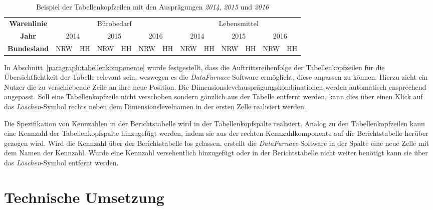 \documentclass[
  language=german, %
  type=bachelor%
]{isthesis}
\begin{document}
\begin{content}
    \begin{table}
      \footnotesize
      \begin{tabular}{c c c c c c c c c c c c c}
        \textbf{Warenlinie} & \multicolumn{6}{c}{Bürobedarf} & \multicolumn{6}{c}{Lebensmittel} \\
        \textbf{Jahr} & \multicolumn{2}{c}{2014} & \multicolumn{2}{c}{2015} & \multicolumn{2}{c}{2016} & \multicolumn{2}{c}{2014} & \multicolumn{2}{c}{2015} & \multicolumn{2}{c}{2016}\\
        \textbf{Bundesland} & NRW & HH & NRW & HH & NRW & HH & NRW & HH & NRW & HH & NRW & HH \\
      \end{tabular}
      \caption{Beispiel der Tabellenkopfzeilen mit den Ausprägungen \textit{2014}, \textit{2015} und \textit{2016}}\label{table:berichtstabellenkopf201420152016}
    \end{table}

  In Abschnitt~\ref{paragraph:tabellenkomponente} wurde festgestellt, dass die
  Auftrittsreihenfolge der Tabellenkopfzeilen für die Übersichtlichtkeit der
  Tabelle relevant sein, weswegen es die \textit{DataFurnace}-Software
  ermöglicht, diese anpassen zu können. Hierzu zieht ein Nutzer die zu
  verschiebende Zeile an ihre neue Position. Die
  Dimensionslevelausprägungskombinationen werden automatisch ensprechend
  angepasst. Soll eine Tabellenkopfzeile nicht verschoben sondern gänzlich aus
  der Tabelle entfernt werden, kann dies über einen Klick auf das
  \textit{Löschen}-Symbol rechts neben dem Dimensionslevelnamen in der ersten
  Zelle realisiert werden.

  Die Spezifikation von Kennzahlen in der Berichtstabelle wird in der
  Tabellenkopfspalte realisiert. Analog zu den Tabellenkopfzeilen kann eine
  Kennzahl der Tabellenkopfspalte hinzugefügt werden, indem sie aus der rechten
  Kennzahlkomponente auf die Berichtstabelle herüber gezogen wird. Wird die
  Kennzahl über der Berichtstabelle los gelassen, erstellt die
  \textit{DataFurnace}-Software in der Spalte eine neue Zelle mit dem Namen der
  Kennzahl. Wurde eine Kennzahl versehentlich hinzugefügt oder in der
  Berichtstabelle nicht weiter benötigt kann sie über das
  \textit{Löschen}-Symbol entfernt werden.


  \section{Technische Umsetzung}



\end{content}
\end{document}
